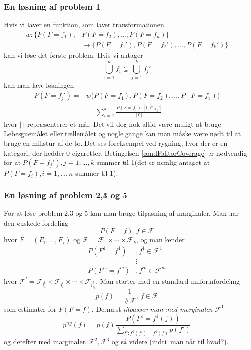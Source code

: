 \documentclass[a4paper, 12pt]{memoir}
\begin{document}
\subsubsection*{En løsning af problem 1}

Hvis vi laver en funktion, som laver transformationen
\begin{align*}
w:\{P(F=f_1), &P(F=f_2), \dots, P(F=f_n)\}\\&\mapsto \{P(F=f_1'), P(F=f_2'), \dots, P(F=f_k')\}
\end{align*}
kan vi løse det første problem. Hvis vi antager 
\begin{equation}
\bigcup_{i=1}^nf_i\subseteq\bigcup_{j=1}^k f_j'\label{condFaktorCoverage}
\end{equation}
kan man lave løsningen
\begin{align*}
P(F=f_j')=&w\bigl( P(F=f_1), P(F=f_2), \dots, P(F=f_n)\bigr)\\
&=\sum_{i=1}^n\frac{P(F=f_i) \cdot |f_i\cap f_j'|}{|f_i|}
\end{align*}
hvor $|\cdot|$ repræsenterer et mål. Det vil dog nok altid være muligt at bruge Lebesguemålet eller tællemålet og nogle gange kan man måske være nødt til at bruge en mikstur af de to. Det ses foreksempel ved rygning, hvor der er en kategori, der hedder 0 cigaretter. Betingelsen \eqref{condFaktorCoverage} er nødvendig for at $P(F=f_j'), j=1,\dots, k$ summer til 1(det er nemlig antaget at $P(F=f_i), i=1, \dots ,n$ summer til 1). 




\subsubsection*{En løsning af problem 2,3 og 5}
For at løse problem 2,3 og 5 kan man bruge tilpasning af marginaler. Man har den ønskede fordeling
\begin{equation*}
P(F=f), f\in \mathcal F
\end{equation*}
hvor $F=(F_1, \dots, F_k)$ og $\mathcal F = \mathcal F_1 \times \cdots \times \mathcal F_k$, og man kender
\begin{align*}
P(F^1=f^1)&, f^1\in \mathcal F^1\\
&\vdots\\
 P(F^m=f^m)&, f^m\in \mathcal F^m
\end{align*}
hvor $\mathcal F^l=\mathcal F_{i^l_1}\times \mathcal F_{i^l_2}\times \cdots \times \mathcal F_{i^l_{r_l}}$. Man starter med en standard uniformfordeling
\begin{equation*}
p(f)=\frac{1}{\#\mathcal F},\,  f\in \mathcal F 
\end{equation*}
som estimater for $P(F=f)$. Dernæst \emph{tilpasser man med marginalen} $\mathcal F^1$
\begin{equation*}
p^{ny}(f)=p(f)\frac{P(F^1=f^1(f))}{\sum_{f': f^1(f')=f^1(f)}p(f')}
\end{equation*}
og derefter med marginalen $\mathcal F^2, \mathcal F^3$ og så videre (indtil man når til hvad?). 
\end{document}

